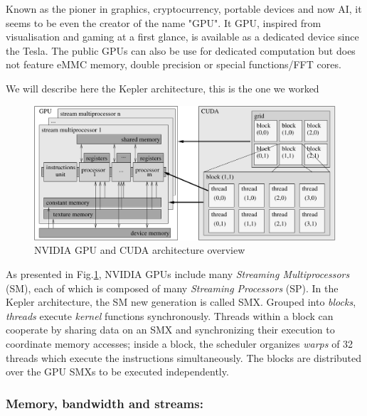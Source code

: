 Known as the pioner in graphics, cryptocurrency, portable devices and now AI, it seems to be even the creator of the name "GPU".
It GPU, inspired from visualisation and gaming at a first glance, is available as a dedicated device  since the Tesla. 
The public GPUs can also be use for dedicated computation but does not feature eMMC memory, double precision or special functions/FFT cores. 

We will describe here the Kepler architecture, this is the one we worked

\begin{figure}[t!]
\centering
\setlength\fboxsep{0pt}
\setlength\fboxrule{0.25pt}
\includegraphics[scale=0.6]{figures/chap1/smx}
\caption{NVIDIA GPU and CUDA architecture overview}
 \label{fig:chap1_gpu}
\end{figure}

As presented in Fig.\ref{fig:chap1_gpu}, NVIDIA GPUs include many \emph{Streaming Multiprocessors} (SM), each of which is composed of many \emph{Streaming Processors} (SP). In the Kepler architecture, the SM new generation is called SMX.
%
Grouped into \emph{blocks}, \textit{threads} execute \emph{kernel} functions synchronously.
Threads within a block can cooperate by sharing data on an SMX and synchronizing their execution to coordinate memory accesses; inside a block, the scheduler organizes \emph{warps} of 32 threads which execute the instructions simultaneously.
The blocks are distributed over the GPU SMXs to be executed independently.

\subsubsection{Memory, bandwidth and streams:}

